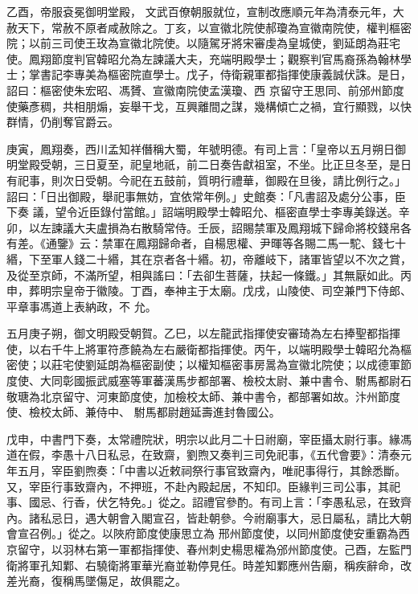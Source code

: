 \begin{pinyinscope}
 乙酉，帝服袞冕御明堂殿，
 文武百僚朝服就位，宣制改應順元年為清泰元年，大赦天下，常赦不原者咸赦除之。丁亥，以宣徽北院使郝瓊為宣徽南院使，權判樞密院；以前三司使王玫為宣徽北院使。以隨駕牙將宋審虔為皇城使，劉延朗為莊宅使。鳳翔節度判官韓昭允為左諫議大夫，充端明殿學士；觀察判官馬裔孫為翰林學士；掌書記李專美為樞密院直學士。戊子，侍衛親軍都指揮使康義誠伏誅。是日，詔曰：樞密使朱宏昭、馮贇、宣徽南院使孟漢瓊、西
 京留守王思同、前邠州節度使藥彥稠，共相朋煽，妄舉干戈，互興離間之謀，幾構傾亡之禍，宜行顯戮，以快群情，仍削奪官爵云。



 庚寅，鳳翔奏，西川孟知祥僭稱大蜀，年號明德。有司上言：「皇帝以五月朔日御明堂殿受朝，三日夏至，祀皇地祇，前二日奏告獻祖室，不坐。比正旦冬至，是日有祀事，則次日受朝。今祀在五鼓前，質明行禮華，御殿在旦後，請比例行之。」詔曰：「日出御殿，舉祀事無妨，宜依常年例。」史館奏：「凡書詔及處分公事，臣下奏
 議，望令近臣錄付當館。」詔端明殿學士韓昭允、樞密直學士李專美錄送。辛卯，以左諫議大夫盧損為右散騎常侍。壬辰，詔賜禁軍及鳳翔城下歸命將校錢帛各有差。《通鑒》云：禁軍在鳳翔歸命者，自楊思權、尹暉等各賜二馬一駝、錢七十緡，下至軍人錢二十緡，其在京者各十緡。初，帝離岐下，諸軍皆望以不次之賞，及從至京師，不滿所望，相與謠曰：「去卻生菩薩，扶起一條鐵。」其無厭如此。丙申，葬明宗皇帝于徽陵。丁酉，奉神主于太廟。戊戌，山陵使、司空兼門下侍郎、平章事馮道上表納政，不
 允。



 五月庚子朔，御文明殿受朝賀。乙巳，以左龍武指揮使安審琦為左右捧聖都指揮使，以右千牛上將軍符彥饒為左右嚴衛都指揮使。丙午，以端明殿學士韓昭允為樞密使；以莊宅使劉延朗為樞密副使；以權知樞密事房暠為宣徽北院使；以成德軍節度使、大同彰國振武威塞等軍蕃漢馬步都部署、檢校太尉、兼中書令、駙馬都尉石敬瑭為北京留守、河東節度使，加檢校太師、兼中書令，都部署如故。汴州節度使、檢校太師、兼侍中、
 駙馬都尉趙延壽進封魯國公。



 戊申，中書門下奏，太常禮院狀，明宗以此月二十日祔廟，宰臣攝太尉行事。緣馮道在假，李愚十八日私忌，在致齋，劉煦又奏判三司免祀事，《五代會要》：清泰元年五月，宰臣劉煦奏：「中書以近敕祠祭行事官致齋內，唯祀事得行，其餘悉斷。又，宰臣行事致齋內，不押班，不赴內殿起居，不知印。臣緣判三司公事，其祀事、國忌、行香，伏乞特免。」從之。詔禮官參酌。有司上言：「李愚私忌，在致齊內。諸私忌日，遇大朝會入閣宣召，皆赴朝參。今祔廟事大，忌日屬私，請比大朝會宣召例。」從之。以陜府節度使康思立為
 邢州節度使，以同州節度使安重霸為西京留守，以羽林右第一軍都指揮使、春州刺史楊思權為邠州節度使。己酉，左監門衛將軍孔知鄴、右驍衛將軍華光裔並勒停見任。時差知鄴應州告廟，稱疾辭命，改差光裔，復稱馬墜傷足，故俱罷之。




\end{pinyinscope}

